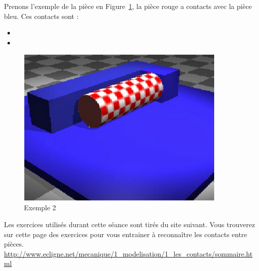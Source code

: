 \documentclass[10pt,fleqn]{article} %
\begin{document}
\begin{exemple}
  Prenons l'exemple de la pièce en Figure~\ref{fig:exemple2}, la pièce rouge a  contacts avec la pièce bleu. Ces contacts sont :

  \begin{itemize}
    \item {}
    \item {}
  \end{itemize}
\end{exemple}
\begin{figure}[h]
  \centering
  \includegraphics[width=0.9\textwidth,height=.2\textheight,keepaspectratio]{images/2lineique_1ponctuel}
  \caption{Exemple 2}
  \label{fig:exemple2}
\end{figure}

\begin{remark}
  Les exercices utilisés durant cette séance sont tirés du site suivant. Vous trouverez sur cette page des exercices pour vous entrainer à reconnaître les contacts entre pièces.\\
  \url{http://www.ecligne.net/mecanique/1_modelisation/1_les_contacts/sommaire.html}
\end{remark}
\end{document}
